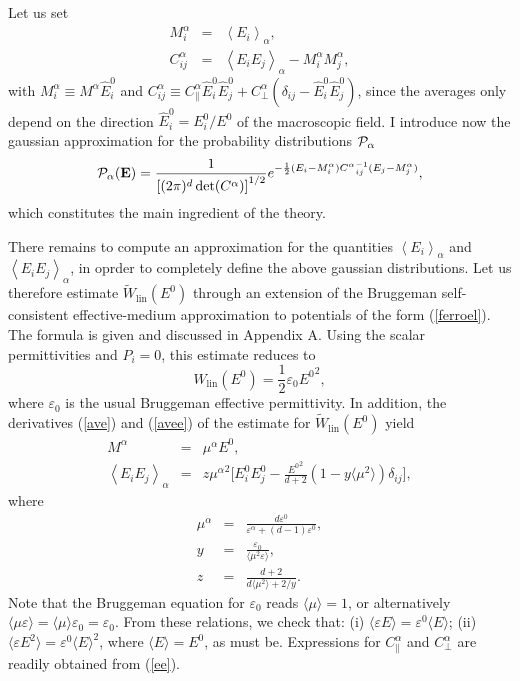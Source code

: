 Let us set
\begin{eqnarray}
M_i^\alpha&=&\left\langle E_i\right\rangle_{\alpha},\\
C^\alpha_{ij}&=&\left\langle E_i E_j\right\rangle_{\alpha}-
M_i^\alpha M_j^\alpha,
\end{eqnarray}
with $M^\alpha_i\equiv M^\alpha \hat{E}^0_i$ and $C^\alpha_{ij}
\equiv C^\alpha_\parallel \hat{E}^0_i\hat{E}^0_j+
C^\alpha_\perp(\delta_{ij}-\hat{E}^0_i\hat{E}^0_j)$, since the 
averages only depend on the direction $\hat{E}^0_i=E^0_i/E^0$ 
of the macroscopic field. I introduce now the gaussian approximation 
for the probability distributions ${\cal P}_\alpha$
\begin{equation}
\label{pae}
{\cal P}_\alpha({\bf E})={1\over \left[(2\pi)^d \det(C^\alpha)
\right]^{1/2}} e^{-{1\over 2}(E_i-M^\alpha_i)
{C^\alpha}^{-1}_{ij}(E_j-M^\alpha_j)},
\end{equation}
which constitutes the main ingredient of the theory. 

There remains to compute an approximation for the quantities 
$\left\langle E_i\right\rangle_{\alpha}$ and $\left\langle 
E_i E_j\right\rangle_{\alpha}$, in oprder to completely define 
the above gaussian distributions. Let us therefore estimate 
$\tilde{W}_{\text{lin}}(E^0)$ through an extension of the 
Bruggeman self-consistent effective-medium approximation\cite{BRUG35} 
to potentials of the form (\ref{ferroel}). The formula is 
given and discussed in Appendix A. Using the scalar 
permittivities and $P_i=0$, this estimate reduces to
\begin{equation}
W_{\text{lin}}(E^0)=\frac{1}{2}\varepsilon_0 {E^0}^2,
\end{equation}
where $\varepsilon_0$ is the usual Bruggeman effective 
permittivity\cite{BRUG35}. In addition, the derivatives 
(\ref{ave}) and (\ref{avee}) of the estimate for 
$\tilde{W}_{\text{lin}}(E^0)$ yield
\begin{eqnarray}
M^\alpha&=&\mu^\alpha E^0,\\
\label{ee}
\left\langle E_i E_j\right\rangle_\alpha&=&z
{\mu^\alpha}^2\Biggl[E^0_iE^0_j
-\frac{{E^0}^2}{d+2}\left(1-y\langle\mu^2
\rangle\right)\delta_{ij}\Biggr],
\end{eqnarray}
where
\begin{eqnarray}
\mu^\alpha&=&\frac{d\varepsilon^0}
{\varepsilon^\alpha+(d-1)\varepsilon^0},\\
y&=&\frac{\varepsilon_0}{\langle\mu^2\varepsilon\rangle},\\
z&=&\frac{d+2}{d\langle\mu^2\rangle+2/y}.
\end{eqnarray}
Note that the Bruggeman equation for $\varepsilon_0$ reads 
$\langle\mu\rangle=1$, or alternatively $\langle\mu
\varepsilon\rangle=\langle\mu\rangle\varepsilon_0=\varepsilon_0$. 
From these relations, we check that: (i) $\langle\varepsilon 
E\rangle=\varepsilon^0 \langle E\rangle$; (ii) $\langle\varepsilon 
E^2\rangle=\varepsilon^0 \langle E\rangle^2$, where $\langle 
E\rangle=E^0$, as must be. Expressions for $C^\alpha_\parallel$ 
and $C^\alpha_\perp$ are readily obtained from (\ref{ee}). 

